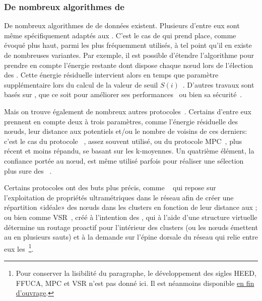         \subsubsection{De nombreux algorithmes de }
De nombreux algorithmes de  de données existent.
Plusieurs d'entre eux sont même spécifiquement adaptés aux \rcsfs.
C'est le cas de \leach qui prend place, comme évoqué plus haut, parmi les plus fréquemment utilisés, à tel point qu'il en existe de nombreuses variantes.
Par exemple, il est possible d'étendre l'algorithme pour prendre en compte l'énergie restante dont dispose chaque nœud lors de l'élection des \CH.
Cette énergie résiduelle intervient alors en temps que paramètre supplémentaire lors du calcul de la valeur de seuil $S(i)$~\cite{HHT02}.
D'autres travaux sont basés sur \leach, que ce soit pour améliorer ses performances~\cite{RR13,CJ14} ou bien sa sécurité~\cite{OFVWBDL07}.

Mais on trouve également de nombreux autres protocoles~\cite{AY07,DQWH13}.
Certains d'entre eux prennent en compte deux à trois paramètres, comme l'énergie résiduelle des nœuds, leur distance aux \chs potentiels et/ou le nombre de voisins de ces derniers: c'est le cas du protocole \heed~\cite{YF04}, assez souvent utilisé, ou du protocole MPC~\cite{KTAA12}, plus récent et moins répandu, se basant sur les k-moyennes.
Un quatrième élément, la confiance portée au nœud, est même utilisé parfois pour réaliser une sélection plus sure des \CH~\cite{KMSL09}.

Certains protocoles ont des buts plus précis, comme \ffuca~\cite{FL11,FMMMI12} qui repose sur l'exploitation de propriétés ultramétriques dans le réseau afin de créer une répartition «idéale» des nœuds dans les clusters en fonction de leur distance aux \CH; ou bien comme VSR~\cite{TV08}, créé à l'intention des , qui à l'aide d'une structure virtuelle détermine un routage proactif pour l'intérieur des clusters (ou les nœuds émettent au \ch en plusieurs sauts) et à la demande sur l'épine dorsale du réseau qui relie entre eux les \CH\,\footnote{Pour conserver la lisibilité du paragraphe, le développement des sigles HEED, FFUCA, MPC et VSR n'est pas donné ici. Il est néanmoins disponible \hyperref[sigles]{en fin d'ouvrage}.}.

